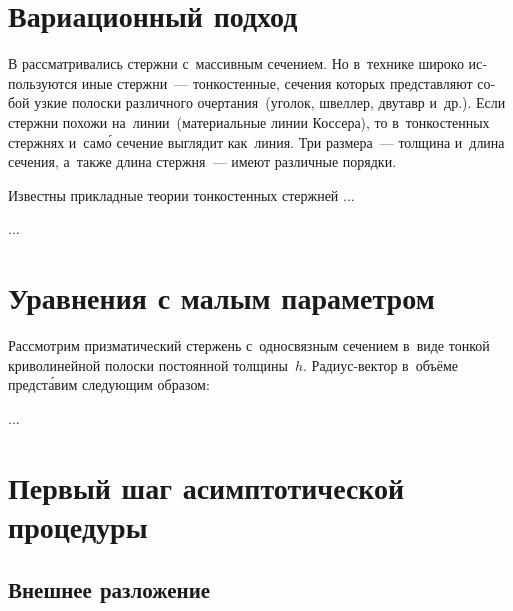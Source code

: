 

\thispagestyle{empty}

\label{chapter:thinwalledrods}

\begin{otherlanguage}{russian}

\section{Вариационный подход}

\lettrine[lines=2, findent=2pt, nindent=0pt]{В}{\hspace{-0.25ex}}  рассматривались стержни с~массивным сечением. Но в~технике широко используются иные стержни~--- тонкостенные, сечения которых представляют собой узкие полоски различного очертания~(уголок, швеллер, двутавр и~др.). Если стержни похожи на~линии~(материальные линии Коссера), то в~тонкостенных стержнях и~сам\'{о} сечение выглядит как~линия. Три размера~--- толщина и~длина сечения, а~также длина стержня~--- имеют различные порядки.

Известны прикладные теории тонкостенных стержней ...

...



\section{Уравнения с малым параметром}

Рассмотрим призматический стержень с~односвязным сечением в~виде тонкой криволинейной полоски постоянной толщины~$h$. Радиус\hbox{-}вектор в~объёме предст\'{а}вим следующим образом:

...



\section{Первый шаг асимптотической процедуры}

\subsection*{Внешнее разложение}


\end{otherlanguage}
